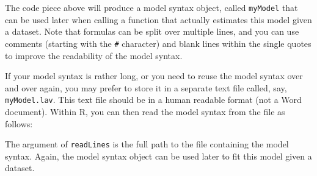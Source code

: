 The code piece above will produce a model syntax object, called
\texttt{myModel} that can be used later when calling a function that
actually estimates this model given a dataset. Note that formulas can be
split over multiple lines, and you can use comments (starting with the
\texttt{\#} character) and blank lines within the single quotes to
improve the readability of the model syntax.

If your model syntax is rather long, or you need to reuse the model
syntax over and over again, you may prefer to store it in a separate
text file called, say, \texttt{myModel.lav}. This text file should be in
a human readable format (not a Word document). Within R, you can then
read the model syntax from the file as follows:

\begin{Shaded}
\begin{Highlighting}[]
\StringTok{ }\NormalTok{(}\NormalTok{)}
\end{Highlighting}
\end{Shaded}

The argument of \texttt{readLines} is the full path to the file
containing the model syntax. Again, the model syntax object can be used
later to fit this model given a dataset.
